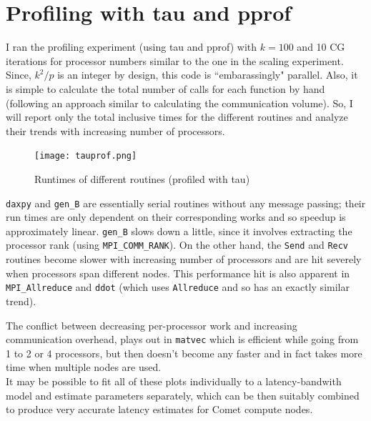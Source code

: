\documentclass[12pt,letterpaper]{article}
\begin{document}
\section*{Profiling with tau and pprof}
\noindent I ran the profiling experiment (using tau and pprof) with $k = 100$ and 10 CG iterations for processor numbers similar to the one in the scaling experiment. Since, $k^2/p$ is an integer by design, this code is ``embarassingly" parallel. Also, it is simple to calculate the total number of calls for each function by hand (following an approach similar to calculating the communication volume). So, I will report only the total inclusive times for the different routines and analyze their trends with increasing number of processors.
\\
\begin{figure}[h]
\flushleft
\texttt{[image: tauprof.png]}
\caption{Runtimes of different routines (profiled with tau)}
\end{figure}

\noindent \texttt{daxpy} and \texttt{gen\_B} are essentially serial routines without any message passing; their run times are only dependent on their corresponding works and so speedup is approximately linear. \texttt{gen\_B} slows down a little, since it involves extracting the processor rank (using \texttt{MPI\_COMM\_RANK}). On the other hand, the \texttt{Send} and \texttt{Recv} routines become slower with increasing number of processors and are hit severely when processors span different nodes. This performance hit is also apparent in \texttt{MPI\_Allreduce} and \texttt{ddot} (which uses \texttt{Allreduce} and so has an exactly similar trend).

\noindent The conflict between decreasing per-processor work and increasing communication overhead, plays out in \texttt{matvec} which is efficient while going from 1 to 2 or 4 processors, but then doesn't become any faster and in fact takes more time when multiple nodes are used.\\ 

\noindent It may be possible to fit all of these plots individually to a latency-bandwith model and estimate parameters separately, which can be then suitably combined to produce very accurate latency estimates for Comet compute nodes.
\end{document}
